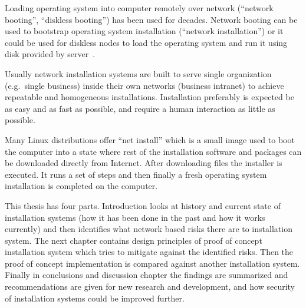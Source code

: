 
\iffalse
\begin{itemize}
\item FIXME: TODO REMOVE THIS LIST
\item INTRODUCTION: The Setting - bird eye's view - the challenge to be tackled / thing to be be improved in general
\item INTRODUCTION: Past research done
\item INTRODUCTION: Gap in knowledge/problem not yet solved
\item INTRODUCTION: Purpose and method of this work
\item INTRODUCTION: More detailed description what was done
\item INTRODUCTION: Results acquired
\item INTRODUCTION: Analysis and limitations of the result (Mostly relocate to Conclusions)
\item INTRODUCTION: Value (Mostly relocate to Conclusions)
\end{itemize}
\fi

Loading operating system into computer remotely over network
(``network booting'', ``diskless booting'') has been used for
decades. Network booting can be used to bootstrap operating system
installation (``network installation'') or it could be used for
diskless nodes to load the operating system and run it using disk
provided by server~\cite{anvin2008x86}.

Usually network installation systems are built to serve single
organization (e.g.\ single business) inside their own networks
(business intranet) to achieve repeatable and homogeneous
installations. Installation preferably is expected be as easy and as
fast as possible, and require a human interaction as little as
possible.

Many Linux distributions offer ``net install'' which is a small image
used to boot the computer into a state where rest of the installation
software and packages can be downloaded directly from Internet. After
downloading files the installer is executed. It runs a set of steps
and then finally a fresh operating system installation is completed on
the computer.

This thesis has four parts. Introduction looks at history and current
state of installation systems (how it has been done in the past and
how it works currently) and then identifies what network based risks
there are to installation system. The next chapter contains design
principles of proof of concept installation system which tries to
mitigate against the identified risks. Then the proof of concept
implementation is compared against another installation system.
Finally in conclusions and discussion chapter the findings are
summarized and recommendations are given for new research and
development, and how security of installation systems could be
improved further.

